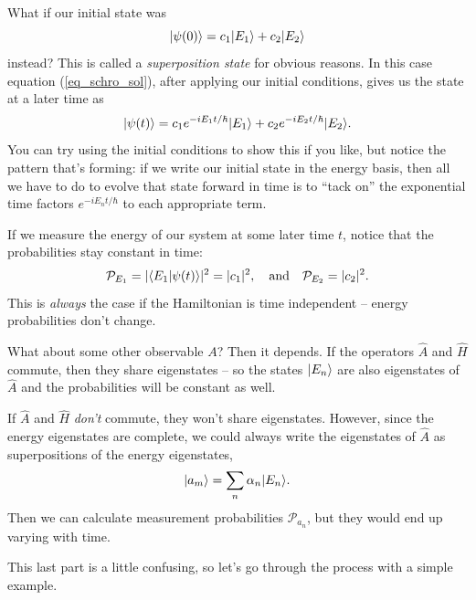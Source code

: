 What if our initial state was 
\[
| \psi(0) \rangle = c_1 | E_1 \rangle + c_2 | E_2 \rangle
\]
instead?  This is called a \emph{superposition state} for obvious reasons.  In this case equation (\ref{eq_schro_sol}), after applying our initial conditions, gives us the state at a later time as
\[
| \psi(t) \rangle = c_1 e^{-iE_1t/\hbar}| E_1 \rangle + c_2 e^{-iE_2t/\hbar} | E_2 \rangle.
\]
You can try using the initial conditions to show this if you like, but notice the pattern that's forming:  if we write our initial state in the energy basis, then all we have to do to evolve that state forward in time is to ``tack on'' the exponential time factors $e^{-iE_nt/\hbar}$ to each appropriate term.  

If we measure the energy of our system at some later time $t$, notice that the probabilities stay constant in time:
\[
\mathcal{P}_{E_1} = | \langle E_1 | \psi(t) \rangle|^2 = |c_1|^2, \quad \text{and} \quad \mathcal{P}_{E_2} = |c_2|^2.
\]
This is \emph{always} the case if the Hamiltonian is time independent -- energy probabilities don't change.

What about some other observable $A$?  Then it depends.  If the operators $\hat{A}$ and $\hat{H}$ commute, then they share eigenstates -- so the states $| E_n \rangle$ are also eigenstates of $\hat{A}$ and the probabilities will be constant as well.

If $\hat{A}$ and $\hat{H}$ \emph{don't} commute, they won't share eigenstates.  However, since the energy eigenstates are complete, we could always write the eigenstates of $\hat{A}$ as superpositions of the energy eigenstates,
\begin{equation}
| a_m \rangle = \sum_n \alpha_n | E_n \rangle.
\end{equation}
Then we can calculate measurement probabilities $\mathcal{P}_{a_n}$, but they would end up varying with time.

This last part is a little confusing, so let's go through the process with a simple example.

